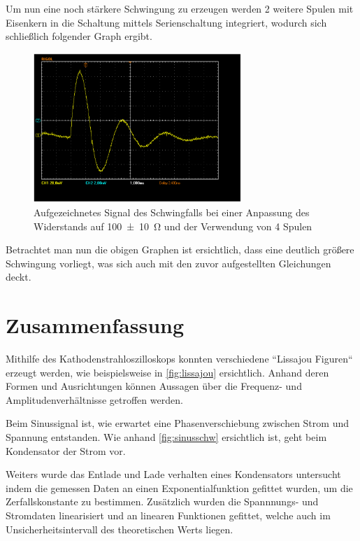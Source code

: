 \documentclass[11pt,ngerman]{scrartcl}
\begin{document}
Um nun eine noch stärkere Schwingung zu erzeugen werden 2 weitere Spulen mit
Eisenkern in die Schaltung mittels Serienschaltung integriert, wodurch sich
schließlich folgender Graph ergibt.

\begin{figure}[H]
	\begin{center}
		\includegraphics[width=0.7\textwidth]{Bild_versuch3_c_100_4}
	\end{center}
	\caption{Aufgezeichnetes Signal des Schwingfalls bei einer Anpassung des
		Widerstands auf \SI{100(10)}{\ohm} und der Verwendung von 4 Spulen}
	\label{fig:schwingfall_100_4}
\end{figure}

Betrachtet man nun die obigen Graphen ist ersichtlich, dass eine deutlich
größere Schwingung vorliegt, was sich auch mit den zuvor aufgestellten
Gleichungen deckt.


\newpage

\section{Zusammenfassung}

Mithilfe des Kathodenstrahloszilloskops konnten verschiedene ``Lissajou
Figuren`` erzeugt werden, wie beispielsweise in \autoref{fig:lissajou}
ersichtlich. Anhand deren Formen und Ausrichtungen können Aussagen über die
Frequenz- und Amplitudenverhältnisse getroffen werden.

\vspace{2mm}

Beim Sinussignal ist, wie erwartet eine Phasenverschiebung zwischen Strom und
Spannung entstanden. Wie anhand \autoref{fig:sinusschw} ersichtlich ist, geht
beim Kondensator der Strom vor.

Weiters wurde das Entlade und Lade verhalten
eines Kondensators untersucht indem die gemessen Daten an einen
Exponentialfunktion gefittet wurden, um die Zerfallskonstante zu bestimmen. Zusätzlich
wurden die Spannnungs- und Stromdaten linearisiert und an linearen Funktionen
gefittet, welche auch im Unsicherheitsintervall des theoretischen Werts
liegen.
\end{document}
